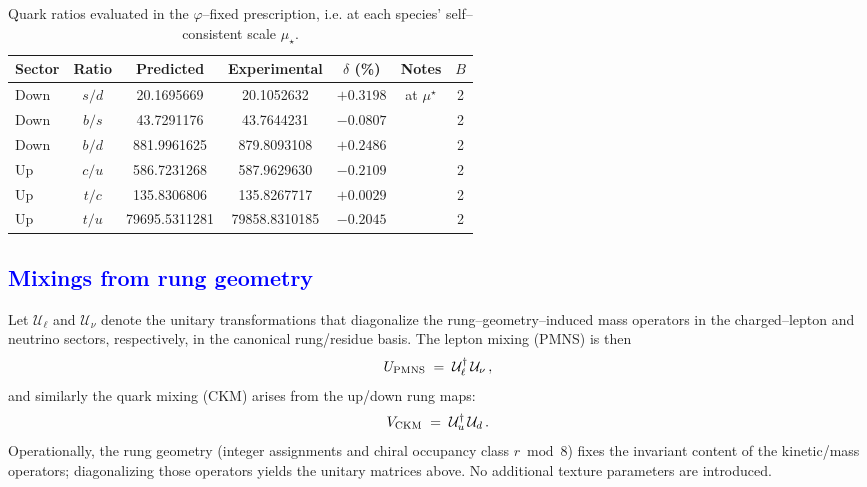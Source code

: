 \documentclass[%
 amsmath,amssymb,
 aps,
prb,
floatfix, showkeys
]{revtex4-2}
\newcommand{\modif}[1]{\textcolor{blue}{#1}}
\begin{document}
\begin{table}[H]
\caption{Quark ratios evaluated in the $\varphi$--fixed prescription, i.e. at each species' self--consistent scale $\mu_\star$.}
\label{tab:quarks}
\begin{tabular}{l c c c c c c}
\hline
Sector & Ratio & Predicted & Experimental & $\delta$ (\%) & Notes & $B$ \\
\hline
Down & $s/d$ & 20.1695669   & 20.1052632   & $+0.3198$ & at $\mu^\star$ & 2 \\
Down & $b/s$ & 43.7291176   & 43.7644231   & $-0.0807$ &                & 2 \\
Down & $b/d$ & 881.9961625  & 879.8093108  & $+0.2486$ &                & 2 \\
Up   & $c/u$ & 586.7231268  & 587.9629630  & $-0.2109$ &                & 2 \\
Up   & $t/c$ & 135.8306806  & 135.8267717  & $+0.0029$ &                & 2 \\
Up   & $t/u$ & 79695.5311281 & 79858.8310185 & $-0.2045$ &               & 2 \\
\hline
\end{tabular}
\end{table}





{\modif{
\subsection{Mixings from rung geometry}
\label{subsec:mixing}
}}
Let $\mathcal{U}_\ell$ and $\mathcal{U}_\nu$ denote the unitary transformations that diagonalize the rung--geometry--induced mass operators in the charged--lepton and neutrino sectors, respectively, in the canonical rung/residue basis. The lepton mixing (PMNS) is then
\begin{equation}
  U_{\rm PMNS} \;=\; \mathcal{U}_\ell^\dagger\,\mathcal{U}_\nu\,,
  \label{eq:pmns_from_geometry}
\end{equation}
and similarly the quark mixing (CKM) arises from the up/down rung maps:
\begin{equation}
  V_{\rm CKM} \;=\; \mathcal{U}_u^\dagger\,\mathcal{U}_d\,.
  \label{eq:ckm_from_geometry}
\end{equation}
Operationally, the rung geometry (integer assignments and chiral occupancy class $r\bmod 8$) fixes the invariant content of the kinetic/mass operators; diagonalizing those operators yields the unitary matrices above. No additional texture parameters are introduced.
\end{document}
